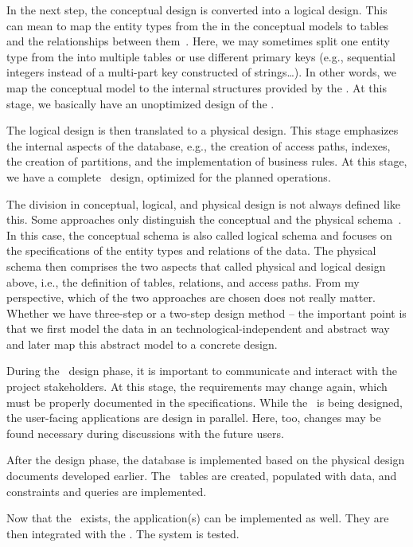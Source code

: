 In the next step, the conceptual design is converted into a logical design.
This can mean to map the entity types from the  in the conceptual models to tables and the relationships between them~\cite{SS2005EIDDDFDB:I,SS2005EIDDDFDB:CDDRAAML}.
Here, we may sometimes split one entity type from the  into multiple tables or use different primary keys (e.g., sequential integers instead of a multi-part key constructed of strings\dots).
In other words, we map the conceptual model to the internal structures provided by the \dbms.
At this stage, we basically have an unoptimized design of the \db.

The logical design is then translated to a physical design.
This stage emphasizes the internal aspects of the database, e.g., the creation of access paths, indexes, the creation of partitions, and the implementation of business rules.
At this stage, we have a complete \db\ design, optimized for the planned operations.

The division in conceptual, logical, and physical design is not always defined like this.
Some approaches only distinguish the conceptual and the physical schema~\cite{G2011EW2ITDS:ITRD,V1999C5DMS:CI}.
In this case, the conceptual schema is also called logical schema and focuses on the specifications of the entity types and relations of the data.
The physical schema then comprises the two aspects that called physical and logical design above, i.e., the definition of tables, relations, and access paths.
From my perspective, which of the two approaches are chosen does not really matter.
Whether we have three-step or a two-step design method -- the important point is that we first model the data in an technological-independent and abstract way and later map this abstract model to a concrete design.

During the \db\ design phase, it is important to communicate and interact with the project stakeholders.
At this stage, the requirements may change again, which must be properly documented in the specifications.
While the \db\ is being designed, the user-facing applications are design in parallel.
Here, too, changes may be found necessary during discussions with the future users.

After the design phase, the database is implemented based on the physical design documents developed earlier.
The \db\ tables are created, populated with data, and constraints and queries are implemented.

Now that the \db\ exists, the application(s) can be implemented as well.
They are then integrated with the \db.
The system is tested.

